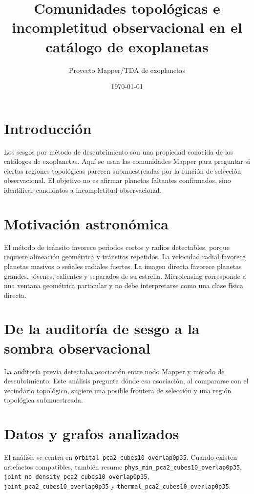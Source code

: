 \documentclass[11pt]{article}
\title{Comunidades topológicas e incompletitud observacional en el catálogo de exoplanetas}
\author{Proyecto Mapper/TDA de exoplanetas}
\date{\today}
\begin{document}
\maketitle

\section{Introducción}
Los sesgos por método de descubrimiento son una propiedad conocida de los catálogos de exoplanetas. Aquí se usan las comunidades Mapper para preguntar si ciertas regiones topológicas parecen submuestreadas por la función de selección observacional. El objetivo no es afirmar planetas faltantes confirmados, sino identificar candidatos a incompletitud observacional.

\section{Motivación astronómica}
El método de tránsito favorece periodos cortos y radios detectables, porque requiere alineación geométrica y tránsitos repetidos. La velocidad radial favorece planetas masivos o señales radiales fuertes. La imagen directa favorece planetas grandes, jóvenes, calientes y separados de su estrella. Microlensing corresponde a una ventana geométrica particular y no debe interpretarse como una clase física directa.

\section{De la auditoría de sesgo a la sombra observacional}
La auditoría previa detectaba asociación entre nodo Mapper y método de descubrimiento. Este análisis pregunta dónde esa asociación, al compararse con el vecindario topológico, sugiere una posible frontera de selección y una región topológica submuestreada.

\section{Datos y grafos analizados}
El análisis se centra en \texttt{orbital\_pca2\_cubes10\_overlap0p35}. Cuando existen artefactos compatibles, también resume \texttt{phys\_min\_pca2\_cubes10\_overlap0p35}, \texttt{joint\_no\_density\_pca2\_cubes10\_overlap0p35}, \texttt{joint\_pca2\_cubes10\_overlap0p35} y \texttt{thermal\_pca2\_cubes10\_overlap0p35}.
\end{document}
